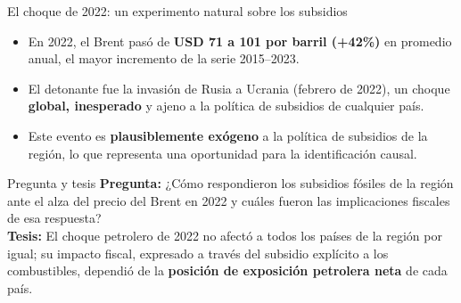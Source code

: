 \documentclass[aspectratio=169,10pt]{beamer}
\newcommand{\key}[1]{{\bfseries\color{AcentoRojo}#1}}
\begin{document}
\begin{frame}{El choque de 2022: un experimento natural sobre los subsidios}
  \begin{itemize}
    \item En 2022, el Brent pasó de \key{USD 71 a 101 por barril (+42\%)} en promedio anual,
          el mayor incremento de la serie 2015--2023.
    \item El detonante fue la \alert{invasión de Rusia a Ucrania} (febrero de 2022), un choque
          \textbf{global, inesperado} y ajeno a la política de subsidios de cualquier país.
    \item Este evento es \textbf{plausiblemente exógeno} a la política de subsidios de la región,
          lo que representa una oportunidad para la identificación causal.
  \end{itemize}

  \begin{block}{Pregunta y tesis}
    \textbf{Pregunta:} ¿Cómo respondieron los subsidios fósiles de la región ante el alza del
    precio del Brent en 2022 y cuáles fueron las implicaciones fiscales de esa respuesta?\\[0.3em]
    \textbf{Tesis:} El choque petrolero de 2022 no afectó a todos los países de la región por igual;
    su impacto fiscal, expresado a través del subsidio explícito a los combustibles, dependió de la
    \textbf{posición de exposición petrolera neta} de cada país.
  \end{block}

\end{frame}
\end{document}
